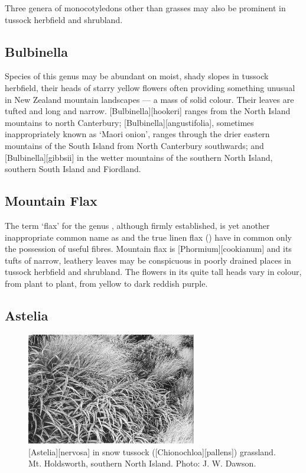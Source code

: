 Three genera of monocotyledons other than grasses may also be prominent in tussock herbfield and shrubland.

\subsection{Bulbinella}

Species of this genus may be abundant on moist, shady slopes in tussock herbfield, their heads of starry yellow flowers often providing something unusual in New Zealand mountain landscapes --- a mass of solid colour.
Their leaves are tufted and long and narrow. [Bulbinella][hookeri] ranges from the North Island mountains to north Canterbury; [Bulbinella][angustifolia], sometimes inappropriately known as `Maori onion', ranges through the drier eastern mountains of the South Island from North Canterbury southwards; and [Bulbinella][gibbsii] in the wetter mountains of the southern North Island, southern South Island and Fiordland.

\subsection{Mountain Flax}

The term `flax' for the genus , although firmly established, is yet another inappropriate common name as  and the true linen flax () have in common only the possession of useful fibres.
Mountain flax is [Phormium][cookianum] and its tufts of narrow, leathery leaves may be conspicuous in poorly drained places in tussock herbfield and shrubland.
The flowers in its quite tall heads vary in colour, from plant to plant, from yellow to dark reddish purple.

\subsection{Astelia}

\begin{figure}
	\includegraphics[width=0.66\textwidth]{graphics/figure103astelia.jpg}
	\centering
	\caption[\emph{Astelia nervosa} in snow tussock]{[Astelia][nervosa] in snow tussock ([Chionochloa][pallens]) grassland.
	Mt. Holdsworth, southern North Island.
	Photo: J. W. Dawson.}%
	\label{fig:103astelia}
\end{figure}

